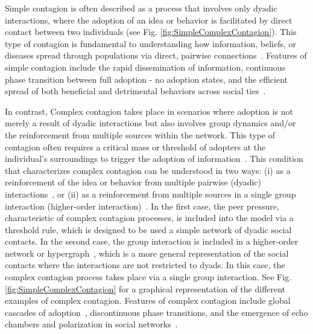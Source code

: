 Simple contagion is often described as a process that involves only dyadic interactions, where the adoption of an idea or behavior is facilitated by direct contact between two individuals (see Fig. \ref{fig:SimpleComplexContagion}). This type of contagion is fundamental to understanding how information, beliefs, or diseases spread through populations via direct, pairwise connections~\cite{pastor2001epidemic, newman2002spread}. Features of simple contagion include the rapid dissemination of information, continuous phase transition between full adoption - no adoption states, and the efficient spread of both beneficial and detrimental behaviors across social ties~\cite{christakis2007spread, fowler2009cooperative}.

In contrast, Complex contagion takes place in scenarios where adoption is not merely a result of dyadic interactions but also involves group dynamics and/or the reinforcement from multiple sources within the network. This type of contagion often requires a critical mass or threshold of adopters at the individual's surroundings to trigger the adoption of information~\cite{centola-2007,centola-2010}. This condition that characterizes complex contagion can be understood in two ways: (i) as a reinforcement of the idea or behavior from multiple pairwise (dyadic) interactions~\cite{centola-2007,centola-2010}, or (ii) as a reinforcement from multiple sources in a single group interaction (higher-order interaction)~\cite{iacopini-2019,de-arruda-2020,battiston-2021}. In the first case, the peer pressure, characteristic of complex contagion processes, is included into the model via a threshold rule, which is designed to be used a simple network of dyadic social contacts. In the second case, the group interaction is included in a higher-order network or hypergraph~\cite{berge1984hypergraphs}, which is a more general representation of the social contacts where the interactions are not restricted to dyads. In this case, the complex contagion process takes place via a single group interaction. See Fig. \ref{fig:SimpleComplexContagion} for a graphical representation of the different examples of complex contagion. Features of complex contagion include global cascades of adoption~\cite{borge2013cascading,gleeson2017temporal}, discontinuous phase transitions, and the emergence of echo chambers and polarization in social networks~\cite{centola-2007,diaz-diaz-2022}.


